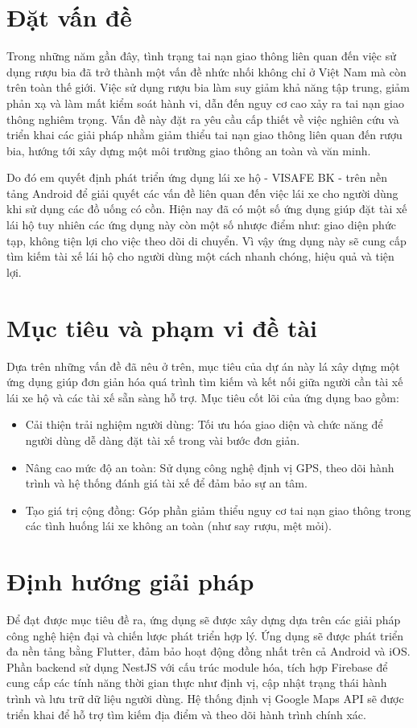 \documentclass[../DoAn.tex]{subfiles}
\begin{document}
\section{Đặt vấn đề}
\label{section:1.1}
Trong những năm gần đây, tình trạng tai nạn giao thông liên quan 
đến việc sử dụng rượu bia đã trở thành một vấn đề nhức nhối không 
chỉ ở Việt Nam mà còn trên toàn thế giới. Việc sử dụng rượu bia làm 
suy giảm khả năng tập trung, giảm phản xạ và làm mất kiểm soát hành vi, 
dẫn đến nguy cơ cao xảy ra tai nạn giao thông nghiêm trọng.
Vấn đề này đặt ra yêu cầu cấp thiết về việc nghiên cứu và triển khai các 
giải pháp nhằm giảm thiểu tai nạn giao thông liên quan đến rượu bia, hướng 
tới xây dựng một môi trường giao thông an toàn và văn minh.

Do đó em quyết định phát triển ứng dụng lái xe hộ - VISAFE BK - trên nền tảng
Android để giải quyết các vấn đề liên quan đến việc lái xe cho người dùng
khi sử dụng các đồ uống có cồn.
Hiện nay đã có một số ứng dụng giúp đặt tài xế lái hộ tuy nhiên các ứng dụng này 
còn một số nhược điểm như: giao diện phức tạp, không tiện lợi cho việc theo dõi di chuyển.
Vì vậy ứng dụng này sẽ cung cấp tìm kiếm tài xế lái hộ cho người dùng một cách nhanh 
chóng, hiệu quả và tiện lợi.
\section{Mục tiêu và phạm vi đề tài}
\label{section:1.2}
Dựa trên những vấn đề đã nêu ở trên, mục tiêu của dự án này lá xây dựng một ứng dụng giúp 
đơn giản hóa quá trình tìm kiếm và kết nối giữa người cần tài xế lái xe hộ và các tài xế 
sẵn sàng hỗ trợ.
Mục tiêu cốt lõi của ứng dụng bao gồm:
\begin{itemize}
  \item Cải thiện trải nghiệm người dùng: Tối ưu hóa giao diện và chức năng để người dùng dễ dàng đặt tài xế trong vài bước đơn giản.
  \item Nâng cao mức độ an toàn: Sử dụng công nghệ định vị GPS, theo dõi hành trình và hệ thống đánh giá tài xế để đảm bảo sự an tâm.
  \item Tạo giá trị cộng đồng: Góp phần giảm thiểu nguy cơ tai nạn giao thông trong các tình huống lái xe không an toàn (như say rượu, mệt mỏi).
\end{itemize}


\section{Định hướng giải pháp}
\label{section:1.3}
Để đạt được mục tiêu đề ra, ứng dụng sẽ được xây dựng dựa trên các giải pháp 
công nghệ hiện đại và chiến lược phát triển hợp lý. Ứng dụng sẽ được phát triển 
đa nền tảng bằng Flutter, đảm bảo hoạt động đồng nhất trên cả Android và iOS. 
Phần backend sử dụng NestJS với cấu trúc module hóa, tích hợp Firebase để cung 
cấp các tính năng thời gian thực như định vị, cập nhật trạng thái hành trình và 
lưu trữ dữ liệu người dùng. Hệ thống định vị Google Maps API sẽ được triển khai 
để hỗ trợ tìm kiếm địa điểm và theo dõi hành trình chính xác.
\end{document}
